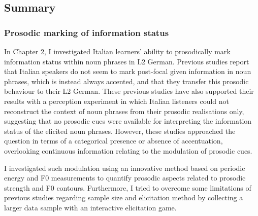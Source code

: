 \subsection{Summary}
\hypertarget{Toc191305961}{}\subsubsection{Prosodic marking of information status}
\hypertarget{Toc191305962}{}\begin{stylecaption}
\textup{In Chapter 2, I investigated Italian learners’ ability to prosodically mark information status within noun phrases in L2 German. Previous studies report that Italian speakers do not seem to mark post-focal given information in noun phrases, which is instead always accented, and that they transfer this prosodic behaviour to their L2 German. These previous studies have also supported their results with a perception experiment in which Italian listeners could not reconstruct the context of noun phrases from their prosodic realisations only, suggesting that no prosodic cues were available for interpreting the information status of the elicited noun phrases. However, these studies approached the question in terms of a categorical presence or absence of accentuation, overlooking continuous information relating to the modulation of prosodic cues.} 
\end{stylecaption}

\begin{stylecaption}
\textup{I investigated such modulation using an innovative method based on periodic energy and F0 measurements to quantify prosodic aspects related to prosodic strength and F0 contours. Furthermore, I tried to overcome some limitations of previous studies regarding sample size and elicitation method by collecting a larger data sample with an interactive elicitation game.}
\end{stylecaption}

